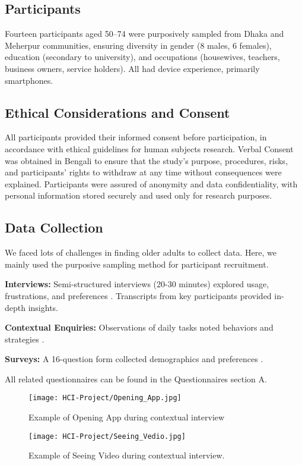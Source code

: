 \documentclass[acmlarge]{acmart}
\begin{document}
\subsection{Participants}
Fourteen participants aged 50–74 were purposively sampled from Dhaka and Meherpur communities, ensuring diversity in gender (8 males, 6 females), education (secondary to university), and occupations (housewives, teachers, business owners, service holders). All had device experience, primarily smartphones.

\subsection{Ethical Considerations and Consent}
All participants provided their informed consent before participation, in accordance with ethical guidelines for human subjects research. Verbal Consent was obtained in Bengali to ensure that the study's purpose, procedures, risks, and participants' rights to withdraw at any time without consequences were explained. Participants were assured of anonymity and data confidentiality, with personal information stored securely and used only for research purposes.

\subsection{Data Collection}

We faced lots of challenges in finding older adults to collect data. Here, we mainly used the purposive sampling method for participant recruitment.

\textbf{Interviews:} Semi-structured interviews (20-30 minutes) explored usage, frustrations, and preferences \cite{creswell2014qualitative, patton2015qualitative}. Transcripts from key participants provided in-depth insights.

\textbf{Contextual Enquiries:} Observations of daily tasks noted behaviors and strategies \cite{beyer1997contextual, holtzblatt2014contextual}.

\textbf{Surveys:} A 16-question form collected demographics and preferences \cite{fowler2013survey, dillman2014internet}.

All related questionnaires can be found in the Questionnaires section A.

\begin{figure}[h]
    \centering
    \begin{minipage}{0.35\textwidth}
        \centering
        \texttt{[image: HCI-Project/Opening\_App.jpg]}
        \caption{Example of Opening App during contextual interview}
        \label{fig:leftimage}
    \end{minipage}\hfill
    \begin{minipage}{0.35\textwidth}
        \centering
        \texttt{[image: HCI-Project/Seeing\_Vedio.jpg]}
        \caption{Example of Seeing Video during contextual interview.}
        \label{fig:centerimage}
    \end{minipage}
\end{figure}
\end{document}
